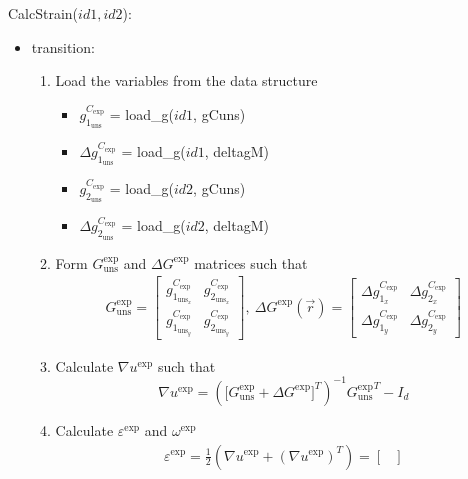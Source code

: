 \documentclass[12pt, titlepage]{article}
\begin{document}
\noindent CalcStrain($id1,id2$):
\begin{itemize}
\item transition:
\begin{enumerate}
\item Load the variables from the data structure 
	\begin{itemize}
	\item $g_{1_{{\text{uns}}}}^{C_{\text{exp}}}$ = load{\_}g($id1$, gCuns)
	\item $\Delta g_{1_{{\text{uns}}}}^{C_{\text{exp}}}$ = load{\_}g($id1$, 
deltagM)
	\item $g_{2_{{\text{uns}}}}^{C_{\text{exp}}}$ = load{\_}g($id2$, gCuns)
	\item $\Delta g_{2_{{\text{uns}}}}^{C_{\text{exp}}}$ = load{\_}g($id2$, 
deltagM)
	\end{itemize}
\item Form ${{G_{\text{uns}}^{\text{exp}}}}$ and $\Delta G^{\text{exp}}$ 
matrices such that
\begin{equation*}
\begin{gathered}
G_{\text{uns}}^{\text{exp}} =
	\begin{bmatrix}
	g_{1_{{\text{uns}}_x}}^{C_{\text{exp}}} & 
g_{2_{{\text{uns}}_x}}^{C_{\text{exp}}} \\
	g_{1_{{\text{uns}}_y}}^{C_{\text{exp}}} & 
g_{2_{{\text{uns}}_y}}^{C_{\text{exp}}} 
	\end{bmatrix}, \ 
\Delta G^{\text{exp}}(\vec{r})=
	\begin{bmatrix}
	\Delta g_{1_{x}}^{C_{\text{exp}}} & \Delta g_{2_{x}}^{C_{\text{exp}}}\\
	\Delta g_{1_{y}}^{C_{\text{exp}}} & \Delta g_{2_{y}}^{C_{\text{exp}}}
	\end{bmatrix}
\end{gathered}
\end{equation*}
\item Calculate $\nabla u^{\text{exp}}$ such that
\begin{equation*}
\nabla u^{\text{exp}} = ({[{G_{\text{uns}}^{\text{exp}}}+\Delta 
G^{\text{exp}}}]^{T})^{-1}{{G_{\text{uns}}^{\text{exp}}}}^{T}-I_{d}
\end{equation*}
\item Calculate $\varepsilon^{\text{exp}}$ and $\omega^{\text{exp}}$
\begin{equation*}
\begin{gathered}
\varepsilon^{\text{exp}} = \frac{1}{2}(\nabla u^{\text{exp}}+(\nabla 
u^{\text{exp}})^{T})= \begin{bmatrix}

\end{bmatrix}
\end{gathered}
\end{equation*}
\end{enumerate}
\end{itemize}
\end{document}
